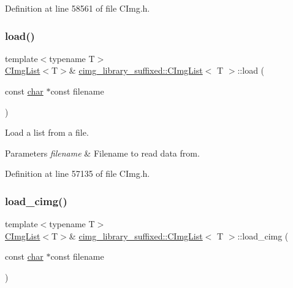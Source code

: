 Definition at line 58561 of file C\+Img.\+h.

\mbox{\label{structcimg__library__suffixed_1_1CImgList_a63bd67d8dd2301933df7decb4612916e}} 
\subsubsection{\texorpdfstring{load()}{load()}}
{\footnotesize\ttfamily template$<$typename T$>$ \\
\hyperlink{structcimg__library__suffixed_1_1CImgList}{C\+Img\+List}$<$T$>$\& \hyperlink{structcimg__library__suffixed_1_1CImgList}{cimg\+\_\+library\+\_\+suffixed\+::\+C\+Img\+List}$<$ T $>$\+::load (\begin{DoxyParamCaption}\item[{const \hyperlink{classchar}{char} $\ast$const}]{filename }\end{DoxyParamCaption})\hspace{0.3cm}{\ttfamily [inline]}}



Load a list from a file. 


\begin{DoxyParams}{Parameters}
{\em filename} & Filename to read data from. \\
\hline
\end{DoxyParams}


Definition at line 57135 of file C\+Img.\+h.

\mbox{\label{structcimg__library__suffixed_1_1CImgList_a71365977297b4b063ca86026467657a4}} 
\subsubsection{\texorpdfstring{load\+\_\+cimg()}{load\_cimg()}\hspace{0.1cm}{\footnotesize\ttfamily [1/3]}}
{\footnotesize\ttfamily template$<$typename T$>$ \\
\hyperlink{structcimg__library__suffixed_1_1CImgList}{C\+Img\+List}$<$T$>$\& \hyperlink{structcimg__library__suffixed_1_1CImgList}{cimg\+\_\+library\+\_\+suffixed\+::\+C\+Img\+List}$<$ T $>$\+::load\+\_\+cimg (\begin{DoxyParamCaption}\item[{const \hyperlink{classchar}{char} $\ast$const}]{filename }\end{DoxyParamCaption})\hspace{0.3cm}{\ttfamily [inline]}}



